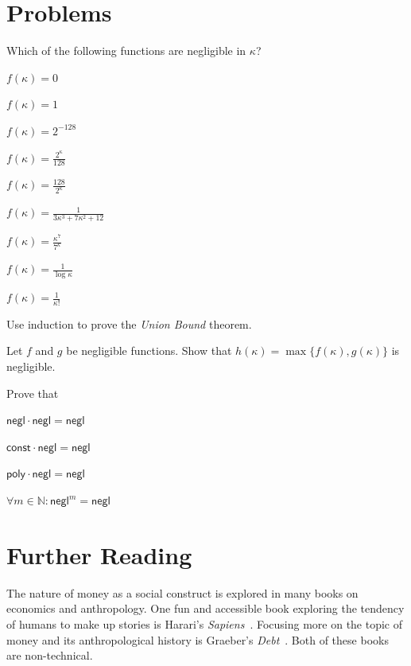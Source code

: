 \section*{Problems}

\begin{problems}
  \item Which of the following functions are negligible in $\kappa$?
    \begin{subproblems}
      \item $f(\kappa) = 0$
      \item $f(\kappa) = 1$
      \item $f(\kappa) = 2^{-128}$
      \item $f(\kappa) = \frac{2^\kappa}{128}$
      \item $f(\kappa) = \frac{128}{2^\kappa}$
      \item $f(\kappa) = \frac{1}{3\kappa^3 + 7\kappa^2 + 12}$
      \item $f(\kappa) = \frac{\kappa^{7}}{7^{\kappa}}$
      \item $f(\kappa) = \frac{1}{\log \kappa}$
      \item $f(\kappa) = \frac{1}{\kappa!}$
    \end{subproblems}
  \item Use induction to prove the \emph{Union Bound} theorem.
  \item Let $f$ and $g$ be negligible functions. Show that $h(\kappa) = \max\{f(\kappa), g(\kappa)\}$
        is negligible.
  \item Prove that
    \begin{subproblems}
      \item $\textsf{negl} \cdot \textsf{negl} = \textsf{negl}$
      \item $\textsf{const} \cdot \textsf{negl} = \textsf{negl}$
      \item $\textsf{poly} \cdot \textsf{negl} = \textsf{negl}$
      \item $\forall m \in \mathbb{N}: \textsf{negl}^m = \textsf{negl}$
    \end{subproblems}
\end{problems}

\section*{Further Reading}

The nature of money as a social construct is explored in many books on economics and anthropology.
One fun and accessible book exploring the tendency of humans to make up stories is Harari's
\emph{Sapiens}~\cite{harari-sapiens}. Focusing more on the topic of money and its anthropological history
is Graeber's \emph{Debt}~\cite{graeber-debt}. Both of these books are non-technical.

